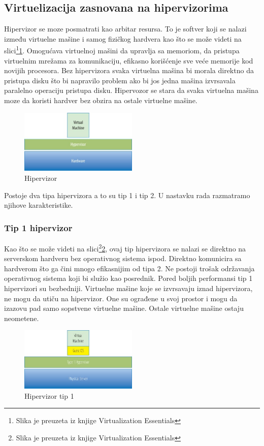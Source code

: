 \documentclass[12pt,oneside]{memoir}
\begin{document}
\subsection{Virtuelizacija zasnovana na hipervizorima}
Hipervizor se moze posmatrati kao arbitar resursa. To je softver koji se nalazi između virtuelne mašine i samog fizičkog hardvera kao što se može videti na slici\footnote{Slika je preuzeta iz knjige Virtualization Essentials}\ref{fig:hipervizor}. Omogućava virtuelnoj mašini da upravlja sa memoriom, da pristupa virtuelnim mrežama za komunikaciju, efikasno korišćenje sve veće memorije kod novijih procesora\cite{ve}. Bez hipervizora svaka virtuelna mašina bi morala direktno da pristupa disku što bi napravilo problem ako bi jos jedna mašina izvrsavala paralelno operaciju pristupa disku. Hipervozor se stara da svaka virtuelna mašina moze da koristi hardver bez obzira na ostale virtuelne mašine.
\begin{figure}[!ht]
  \centering
  \includegraphics[width=0.5\textwidth]{Slika 1.jpg}
  \caption{Hipervizor}
  \label{fig:hipervizor}
\end{figure}
 
Postoje dva tipa hipervizora a to su tip 1 i tip 2. U nastavku rada razmatramo njihove karakteristike.
 
\subsubsection{Tip 1 hipervizor}
Kao što se može videti na slici\footnote{Slika je preuzeta iz knjige Virtualization Essentials}\ref{fig:hipervizorTip1}, ovaj tip hipervizora se nalazi se direktno na serverskom hardveru bez operativnog sistema ispod. Direktno komunicira sa hardverom što ga čini mnogo efikasnijim od tipa 2. Ne postoji trošak održavanja operativnog sistema koji bi služio kao posrednik. Pored boljih performansi tip 1 hipervizori su bezbedniji. Virtuelne mašine koje se izvrsavaju iznad hipervizora, ne mogu da utiču na hipervizor. One su ograđene u svoj prostor i mogu da izazovu pad samo sopstvene virtuelne mašine. Ostale virtuelne mašine ostaju neometene.
\begin{figure}[!ht]
  \centering
  \includegraphics[width=0.5\textwidth]{Slika 2.jpg}
  \caption{Hipervizor tip 1}
  \label{fig:hipervizorTip1}
\end{figure}
 
\end{document}
